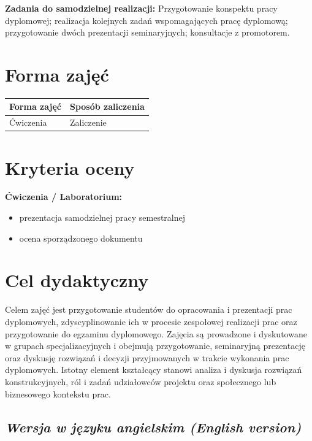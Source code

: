 \documentclass[12pt, a4paper]{article}
\newcommand{\thdrule}{\noalign{\global\setlength{\extrarowheight}{0pt}}}
\newcommand{\thdend}{\noalign{\global\setlength{\extrarowheight}{3pt}}}
\begin{document}
\vspace{4pt}
\noindent\textbf{Zadania do samodzielnej realizacji:} Przygotowanie konspektu pracy dyplomowej; realizacja kolejnych zadań wspomagających pracę dyplomową; przygotowanie dwóch prezentacji seminaryjnych; konsultacje z promotorem.

\section{Forma zajęć}

\begin{center}
{\scriptsize
\begin{tabular}{m{5cm}m{8cm}}
\thdrule\toprule
\rowcolor{pjatkRed} {\color{white}\textbf{Forma zajęć}} & {\color{white}\textbf{Sposób zaliczenia}} \\
\midrule\thdend
  \rowcolor{tableRowLight} Ćwiczenia & Zaliczenie \\
\bottomrule
\end{tabular}}
\end{center}

\section{Kryteria oceny}

\textbf{Ćwiczenia / Laboratorium:}
\begin{itemize}
  \item prezentacja samodzielnej pracy semestralnej
  \item ocena sporządzonego dokumentu
\end{itemize}


\section{Cel dydaktyczny}

Celem zajęć jest przygotowanie studentów do opracowania i prezentacji prac dyplomowych, zdyscyplinowanie ich w procesie zespołowej realizacji prac oraz przygotowanie do egzaminu dyplomowego. Zajęcia są prowadzone i dyskutowane w grupach specjalizacyjnych i obejmują przygotowanie, seminaryjną prezentację oraz dyskusję rozwiązań i decyzji przyjmowanych w trakcie wykonania prac dyplomowych. Istotny element kształcący stanowi analiza i dyskusja rozwiązań konstrukcyjnych, ról i zadań udziałowców projektu oraz społecznego lub biznesowego kontekstu prac.

\subsection*{\textit{Wersja w języku angielskim (English version)}}
\end{document}
